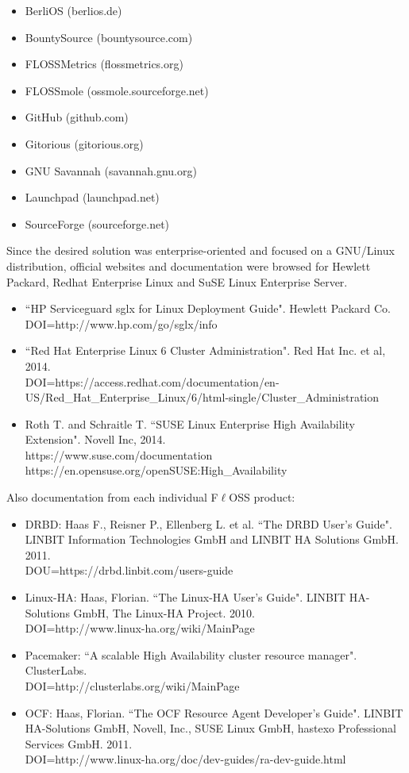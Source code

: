 \documentclass[a4paper, 12pt]{book}
\begin{document}
\begin{itemize}
	\item BerliOS (berlios.de)
	\item BountySource (bountysource.com)
	\item FLOSSMetrics (flossmetrics.org)
	\item FLOSSmole (ossmole.sourceforge.net)
	\item GitHub (github.com)
	\item Gitorious (gitorious.org)
	\item GNU Savannah (savannah.gnu.org)
	\item Launchpad (launchpad.net)
	\item SourceForge (sourceforge.net)
\end{itemize}

\noindent Since the desired solution was enterprise-oriented and focused on a GNU/Linux distribution, official websites and documentation were browsed for Hewlett Packard, Redhat Enterprise Linux and SuSE Linux Enterprise Server.

\begin{itemize}
	\item ``HP Serviceguard sglx for Linux Deployment Guide". Hewlett Packard Co.\\
	      DOI=http://www.hp.com/go/sglx/info
	\item ``Red Hat Enterprise Linux 6 Cluster Administration". Red Hat Inc. et al, 2014.\\
	      DOI=https://access.redhat.com/documentation/en-US/Red\_Hat\_Enterprise\_Linux/6/html-single/Cluster\_Administration
	\item Roth T. and Schraitle T. ``SUSE Linux Enterprise High Availability Extension". Novell Inc, 2014.\\
	      https://www.suse.com/documentation\\
	      https://en.opensuse.org/openSUSE:High\_Availability
\end{itemize}

\noindent Also documentation from each individual F$\ell$OSS product:

\begin{itemize}
	\item DRBD: Haas F., Reisner P., Ellenberg L. et al. ``The DRBD User's Guide". LINBIT Information Technologies GmbH and LINBIT HA Solutions GmbH. 2011.\\
	DOU=https://drbd.linbit.com/users-guide
	\item Linux-HA: Haas, Florian. ``The Linux-HA User's Guide". LINBIT HA-Solutions GmbH, The Linux-HA Project. 2010. \\
	DOI=http://www.linux-ha.org/wiki/MainPage
	\item Pacemaker: ``A scalable High Availability cluster resource manager". ClusterLabs. \\
	DOI=http://clusterlabs.org/wiki/MainPage
	\item OCF: Haas, Florian. ``The OCF Resource Agent Developer's Guide". LINBIT HA-Solutions GmbH, Novell, Inc., SUSE Linux GmbH, hastexo Professional Services GmbH. 2011. \\
        DOI=http://www.linux-ha.org/doc/dev-guides/ra-dev-guide.html
\end{itemize}
\end{document}
